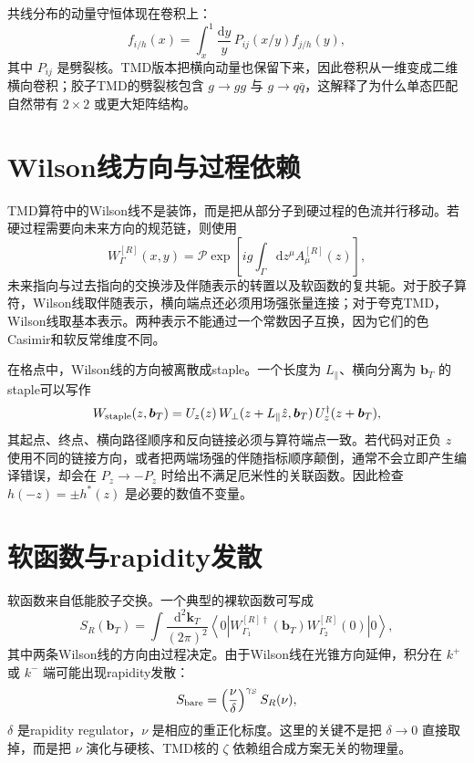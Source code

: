 \documentclass[UTF8,12pt,a4paper,twoside,openany]{ctexbook}
\newcommand{\dd}{\mathrm{d}}
\newcommand{\bT}{\boldsymbol b_T}
\begin{document}
共线分布的动量守恒体现在卷积上：
\begin{equation}
  f_{i/h}(x)=\int_x^1\frac{\dd y}{y}\,
  P_{ij}(x/y)f_{j/h}(y),
  \label{eq:collinear-convolution}
\end{equation}
其中 \(P_{ij}\) 是劈裂核。TMD版本把横向动量也保留下来，因此卷积从一维变成二维横向卷积；胶子TMD的劈裂核包含 \(g\to gg\) 与 \(g\to q\bar q\)，这解释了为什么单态匹配自然带有 \(2\times2\) 或更大矩阵结构。

\section{Wilson线方向与过程依赖}

TMD算符中的Wilson线不是装饰，而是把从部分子到硬过程的色流并行移动。若硬过程需要向未来方向的规范链，则使用
\begin{equation}
  W_{\Gamma}^{[R]}(x,y)
  =\mathcal P\exp\left[ig\int_\Gamma\dd z^\mu A_\mu^{[R]}(z)\right],
  \label{eq:wilson-general}
\end{equation}
未来指向与过去指向的交换涉及伴随表示的转置以及软函数的复共轭。对于胶子算符，Wilson线取伴随表示，横向端点还必须用场强张量连接；对于夸克TMD，Wilson线取基本表示。两种表示不能通过一个常数因子互换，因为它们的色Casimir和软反常维度不同。

在格点中，Wilson线的方向被离散成staple。一个长度为 \(L_\parallel\)、横向分离为 \(\bT\) 的staple可以写作
\begin{equation}
  W_{\rm staple}(z,\bT)
  =U_z(z)\,W_{\perp}(z+L_\parallel\hat z,\bT)\,
  U_z^\dagger(z+\bT),
  \label{eq:staple-order}
\end{equation}
其起点、终点、横向路径顺序和反向链接必须与算符端点一致。若代码对正负 \(z\) 使用不同的链接方向，或者把两端场强的伴随指标顺序颠倒，通常不会立即产生编译错误，却会在 \(P_z\to-P_z\) 时给出不满足厄米性的关联函数。因此检查 \(h(-z)=\pm h^*(z)\) 是必要的数值不变量。

\section{软函数与rapidity发散}

软函数来自低能胶子交换。一个典型的裸软函数可写成
\begin{equation}
  S_R(\bT)=\int\frac{\dd^2\mathbf k_T}{(2\pi)^2}
  \left\langle 0\left|
  W_{\Gamma_1}^{[R]\dagger}(\bT)
  W_{\Gamma_2}^{[R]}(0)
  \right|0\right\rangle ,
  \label{eq:bare-soft}
\end{equation}
其中两条Wilson线的方向由过程决定。由于Wilson线在光锥方向延伸，积分在 \(k^+\) 或 \(k^-\) 端可能出现rapidity发散：
\begin{equation}
  S_{\rm bare}
  =\left(\frac{\nu}{\delta}\right)^{\gamma_S}
  S_R(\nu),
  \label{eq:rapidity-divergence}
\end{equation}
\(\delta\) 是rapidity regulator，\(\nu\) 是相应的重正化标度。这里的关键不是把 \(\delta\to0\) 直接取掉，而是把 \(\nu\) 演化与硬核、TMD核的 \(\zeta\) 依赖组合成方案无关的物理量。
\end{document}

